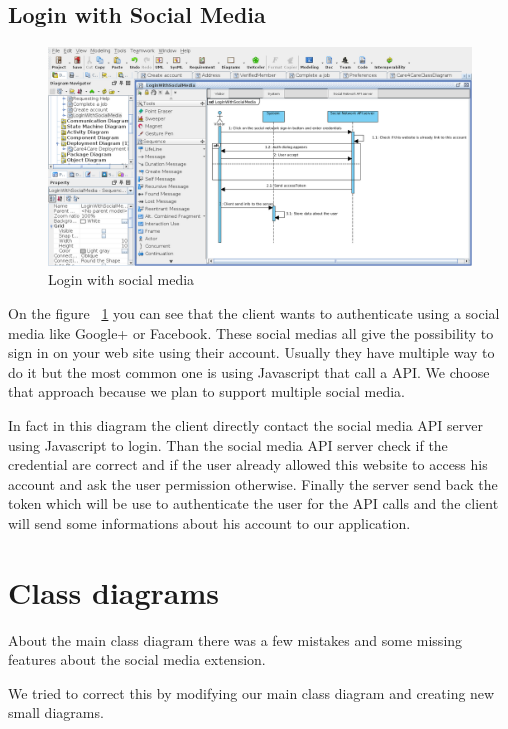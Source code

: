 \documentclass[11pt, a4paper]{article}   	%
\begin{document}
\subsection{Login with Social Media}

\begin{figure}[!ht]
   \includegraphics[width=\textwidth]{loginWithSocialMedia.png}
   \caption{\label{loginWithSocialMedia} Login with social media}
\end{figure}

On the figure ~\ref{loginWithSocialMedia} you can see that the client wants to authenticate using a social media like Google+ or Facebook. These social medias all give the possibility to sign in on your web site using their account. Usually they have multiple way to do it but the most common one is using Javascript that call a API. We choose that approach because we plan to support multiple social media.

In fact in this diagram the client directly contact the social media API server using Javascript to login. Than the social media API server check if the credential are correct and if the user already allowed this website to access his account and ask the user permission otherwise. 
Finally the server send back the token which will be use to authenticate the user for the API calls and the client will send some informations about his account to our application.


\section{Class diagrams}

About the main class diagram there was a few mistakes and some missing features about the social media extension. 

We tried to correct this by modifying our main class diagram and creating new small diagrams.
\end{document}
